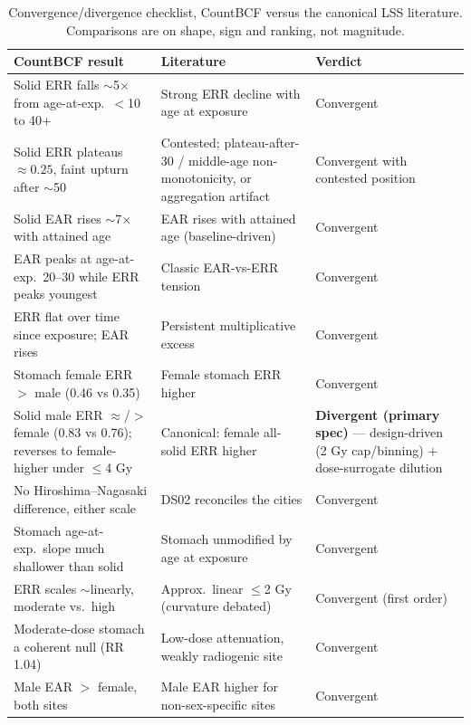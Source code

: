 \documentclass[11pt]{article}
\begin{document}
\begin{table}[htbp]
\centering
\caption{Convergence/divergence checklist, CountBCF versus the canonical LSS
literature. Comparisons are on shape, sign and ranking, not magnitude.}
\label{tab:applied-checklist}
\small
\begin{tabular}{p{}p{}p{}}
\toprule
CountBCF result & Literature & Verdict \\
\midrule
Solid ERR falls $\sim$5$\times$ from age-at-exp.\ $<$10 to 40+ & Strong ERR decline with age at exposure \citep{preston2007,grant2017} & Convergent \\
Solid ERR plateaus $\approx 0.25$, faint upturn after $\sim$50 & Contested; plateau-after-30 / middle-age non-monotonicity, or aggregation artifact \citep{beirvii2006,shuryak2010,little2009} & Convergent with contested position \\
Solid EAR rises $\sim$7$\times$ with attained age & EAR rises with attained age (baseline-driven) \citep{preston2007,grant2017} & Convergent \\
EAR peaks at age-at-exp.\ 20--30 while ERR peaks youngest & Classic EAR-vs-ERR tension \citep{pierce2000} & Convergent \\
ERR flat over time since exposure; EAR rises & Persistent multiplicative excess \citep{preston2007,ozasa2012} & Convergent \\
Stomach female ERR $>$ male (0.46 vs 0.35) & Female stomach ERR higher \citep{sakata2019} & Convergent \\
Solid male ERR $\approx$/$>$ female (0.83 vs 0.76); reverses to female-higher under $\leq$4 Gy & Canonical: female all-solid ERR higher \citep{preston2007,grant2017} & \textbf{Divergent (primary spec)} --- design-driven (2 Gy cap/binning) $+$ dose-surrogate dilution \citep{walsh2016,brenner2018} \\
No Hiroshima--Nagasaki difference, either scale & DS02 reconciles the cities \citep{preston2007,ds02} & Convergent \\
Stomach age-at-exp.\ slope much shallower than solid & Stomach unmodified by age at exposure \citep{sakata2019} & Convergent \\
ERR scales $\sim$linearly, moderate vs.\ high & Approx.\ linear $\leq$2 Gy (curvature debated) \citep{preston2007,cologne2019} & Convergent (first order) \\
Moderate-dose stomach a coherent null (RR 1.04) & Low-dose attenuation, weakly radiogenic site \citep{sakata2019} & Convergent \\
Male EAR $>$ female, both sites & Male EAR higher for non-sex-specific sites \citep{preston2007} & Convergent \\
\bottomrule
\end{tabular}
\end{table}
\end{document}

